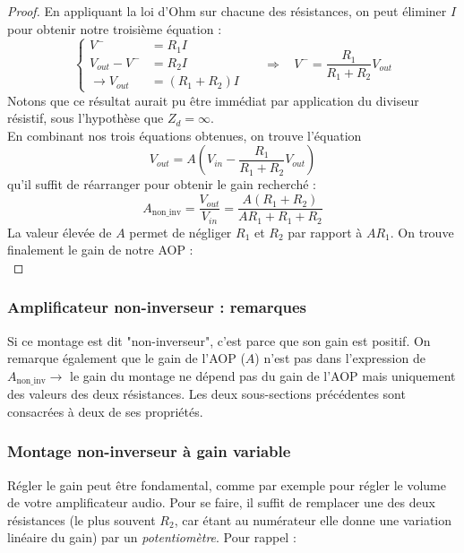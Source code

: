 \documentclass	[11pt, a4paper, openany]{book}
\newcommand{\prop}[1]{\adjustbox{minipage=\linewidth-2\fboxsep-2\fboxrule,fbox}{\begin{center}
#1\end{center}}}
\begin{document}
\begin{proof}
 En appliquant la loi d'Ohm sur chacune des résistances, on peut éliminer $I$ pour obtenir notre troisième équation : 
\begin{equation}
\left\{\begin{array}{ll}
V^- & = R_1I\\
V_{out} - V^- & = R_2I\\
\rightarrow V_{out} & = (R_1+R_2)I
\end{array}\right.\ \ \ \ \ \ \ \Rightarrow\ \ \ \ V^- = \dfrac{R_1}{R_1+R_2}V_{out}
\end{equation}
Notons que ce résultat aurait pu être immédiat par application du diviseur résistif, sous l'hypothèse que $Z_d = \infty$.\\ En combinant nos trois équations obtenues, on trouve l'équation
\begin{equation}
V_{out} = A\left(V_{in} - \dfrac{R_1}{R_1 + R_2}V_{out}\right)
\end{equation}
qu'il suffit de réarranger pour obtenir le gain recherché :
\begin{equation}
A_{\text{non\_inv}} = \frac{V_{out}}{V_{in}} = \frac{A(R_1+R_2)}{AR_1+R_1+R_2}
\end{equation}
La valeur élevée de $A$ permet de négliger $R_1$ et $R_2$ par rapport à $AR_1$. On trouve finalement le gain de notre AOP :\\

\prop{$A_{\text{non\_inv}} \approx 1 + \frac{R_2}{R_1}$}
\end{proof}

\subsubsection{Amplificateur non-inverseur : remarques}
Si ce montage est dit "non-inverseur", c'est parce que son gain est positif. On remarque également que le gain de l'AOP ($A$) n'est pas dans l'expression de $A_{\text{non\_inv}} \rightarrow$ le gain du montage ne dépend pas du gain de l'AOP mais uniquement des valeurs des deux résistances. Les deux sous-sections précédentes sont consacrées à deux de ses propriétés.

\subsubsection{Montage non-inverseur à gain variable}
Régler le gain peut être fondamental, comme par exemple pour régler le volume de votre amplificateur audio. Pour se faire, il suffit de remplacer une des deux résistances (le plus souvent $R_2$, car étant au numérateur elle donne une variation linéaire du gain) par un \textit{potentiomètre}. Pour rappel :\\
\end{document}
